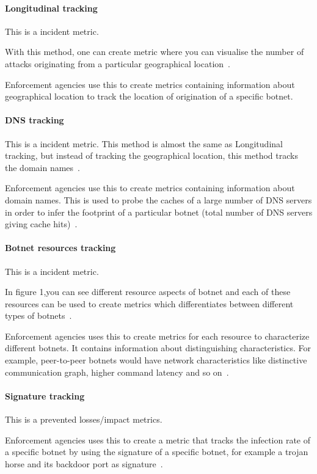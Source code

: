 \paragraph{Longitudinal tracking}
This is a incident metric.

With this method, one can create metric where you can visualise the number of attacks originating from a particular geographical location~\cite{AM2006}.

Enforcement agencies use this to create metrics containing information about geographical location to track the location of origination of a specific botnet.

\paragraph{DNS tracking}
This is a incident metric.
This method is almost the same as Longitudinal tracking, but instead of tracking the geographical location, this method tracks the domain names~\cite{AM2006}.

Enforcement agencies use this to create metrics containing information about domain names. This is used to probe the caches of a large number of DNS servers in order to infer the footprint of a particular botnet (total number of DNS servers giving cache hits)~\cite{AM2006}.

\paragraph{Botnet resources tracking}
This is a incident metric.

In figure 1,you can see different resource aspects of botnet and each of these resources can be used to create metrics which differentiates between different types of botnets~\cite{GJ2007}.

Enforcement agencies uses this to create metrics for each resource to characterize different botnets. It contains information about distinguishing characteristics. For example, peer-to-peer botnets would have network characteristics like distinctive communication graph, higher command latency and so on~\cite{GJ2007}.

\paragraph{Signature tracking}
This is a prevented losses/impact metrics.

Enforcement agencies uses this to create a metric that tracks the infection rate of a specific botnet by using the
signature of a specific botnet, for example a trojan horse and its backdoor port as signature~\cite{AM2005}.









